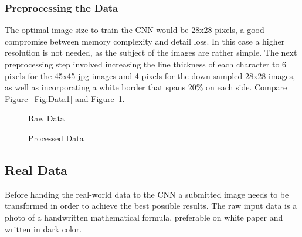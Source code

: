 \documentclass[@CLASSOPTIONS@]{tumarticle}
\begin{document}
\subsubsection{Preprocessing the Data}

The optimal image size to train the CNN would be 28x28 pixels, a good compromise between
memory complexity and detail loss.
In this case a higher resolution is not needed, as the subject of the images are rather simple.
The next preprocessing step involved increasing the line thickness of each character to 6 pixels
for the 45x45 jpg images and 4 pixels for the down sampled 28x28 images,
as well as incorporating a white border that spans 20\% on each side.
Compare Figure~\ref{Fig:Data1} and Figure~\ref{Fig:Data2}.

\begin{figure}[!htb]
   \begin{minipage}{0.24\textwidth}
     \centering
     \caption{Raw Data}\label{Fig:Data1}
   \end{minipage}\hfill
   \begin{minipage}{0.24\textwidth}
     \centering
     \caption{Processed Data}\label{Fig:Data2}
   \end{minipage}
\end{figure}

\subsection{Real Data}
\label{subsec:realdata}
Before handing the real-world data to the CNN a submitted image needs
to be transformed in order to achieve the best possible results.
The raw input data is a photo of a handwritten mathematical formula, preferable on white paper
and written in dark color.
\end{document}
